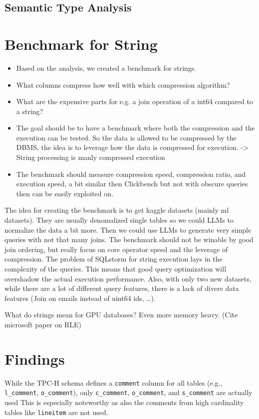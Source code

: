 \subsection{Semantic Type Analysis}\label{subsec:semantic-type-analysis}



\section{Benchmark for String}\label{sec:benchmark-for-string}
\begin{itemize}
    \item  Based on the analysis, we created a benchmark for strings.
    \item  What columns compress how well with which compression algorithm?
    \item  What are the expensive parts for e.g. a join operation of a int64 compared to a string?
    \item The goal should be to have a benchmark where both the compression and the execution can be tested.
    So the data is allowed to be compressed by the DBMS, the idea is to leverage how the data is compressed for execution.
    -> String processing is manly compressed execution
    \item The benchmark should measure compression speed, compression ratio, and execution speed, a bit similar then
    Clickbench but not with obscure queries then can be easily exploited on.
\end{itemize}

The idea for creating the benchmark is to get kaggle datasets (mainly ml datasets). They are usually denomalized single
tables so we could LLMs to normalize the data a bit more. Then we could use LLMs to generate very simple queries with
not that many joins. The benchmark should not be winable by good join ordering, but really focus on core operator
speed and the leverage of compression.
The problem of SQLstorm for string execution lays in the complexity of the queries. This means that good
query optimization will overshadow the actual execution performance.
Also, with only two new datasets, while there are a lot of different query features, there is a lack of divere data
features (Join on emails instead of uint64 ids, \ldots).

What do strings mean for GPU databases? Even more memory heavy. (Cite microsoft paper on RLE)


\section{Findings}\label{sec:findings}
While the TPC-H schema defines a \texttt{comment} column for all tables
(e.g., \texttt{l\_comment}, \texttt{o\_comment}), only \texttt{c\_comment},
\texttt{o\_comment}, and \texttt{s\_comment} are actually used
This is especially noteworthy as also the comments from high cardinality tables like \texttt{lineitem} are not used.

